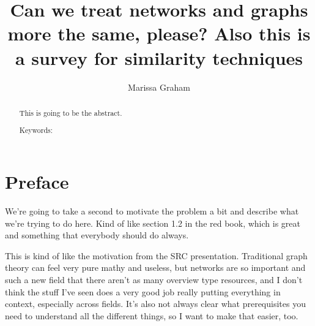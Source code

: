 \documentclass[12pt]{thesis}
\author{Marissa Graham}
\title{Can we treat networks and graphs more the same, please? Also this is a survey for similarity techniques}
\theoremstyle{plain}
\theoremstyle{definition}
\theoremstyle{remark}
\begin{document}

\frontmatter 
\maketitle 

\begin{abstract}
This is going to be the abstract.		
\vskip 3.25in
 
\noindent Keywords: %
\end{abstract}


\tableofcontents
\listoftables
\listoffigures
\mainmatter





\section{Preface}
We're going to take a second to motivate the problem a bit and describe what we're trying to do here. Kind of like section 1.2 in the red book, which is great and something that everybody should do always.

This is kind of like the motivation from the SRC presentation. Traditional graph theory can feel very pure mathy and useless, but networks are so important and such a new field that there aren't as many overview type resources, and I don't think the stuff I've seen does a very good job really putting everything in context, especially across fields. It's also not always clear what prerequisites you need to understand all the different things, so I want to make that easier, too.
\end{document}
